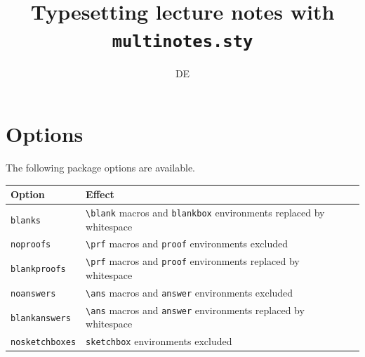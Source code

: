 \documentclass{article}
\title{Typesetting lecture notes with {\tt multinotes.sty}}
\author{DE}
\theoremstyle{definition}
\begin{document}
\maketitle

\tableofcontents

\newpage

\section{Options}

The following package options are available.
\begin{table}[htb]
\renewcommand{\arraystretch}{1.3}
\addtolength{\tabcolsep}{2ex}
\begin{tabular}{lll}
\hline\hline
Option				& Effect \\
\hline
{\tt blanks}		& \verb+\blank+ macros and \verb+blankbox+ environments replaced by whitespace \\
{\tt noproofs}		& \verb+\prf+ macros and \verb+proof+ environments excluded \\
{\tt blankproofs}	& \verb+\prf+ macros and \verb+proof+ environments replaced by whitespace \\
{\tt noanswers}		& \verb+\ans+ macros and \verb+answer+ environments excluded \\
{\tt blankanswers}	& \verb+\ans+ macros and \verb+answer+ environments replaced by whitespace \\
{\tt nosketchboxes}	& \verb+sketchbox+ environments excluded \\
\hline\hline
\end{tabular}
\end{table}
\end{document}
